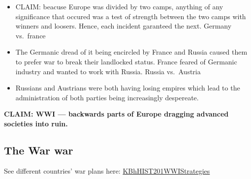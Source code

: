 \documentclass[letterpaper]{article}
\begin{document}
\begin{itemize}
\item CLAIM: beacuse Europe was divided by two camps, anything of any
significance that occured was a test of strength between the two camps
with winners and loosers. Hence, each incident garanteed the next.
Germany vs. france
\item The Germanic dread of it being encircled by France and Russia caused
them to prefer war to break their landlocked status. France feared of
Germanic industry and wanted to work with Russia. Russia vs. Austria
\item Russians and Austrians were both having losing empires which lead to
the administration of both parties being increasingly despereate.
\end{itemize}

\textbf{CLAIM: WWI --- backwards parts of Europe dragging advanced societies
into ruin.}

\subsection{The War war}
\label{sec:orgae1fab1}
See different countries' war plans here:
\href{KBhHIST201WWIStrategies.org}{KBhHIST201WWIStrategies}
\end{document}
